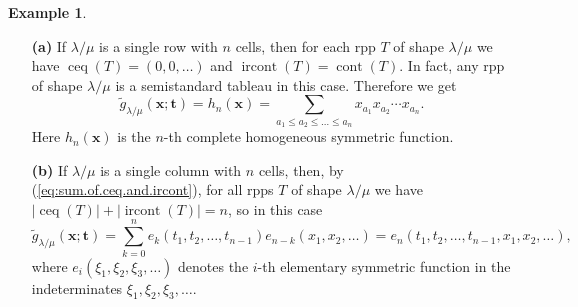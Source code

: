 \documentclass[12pt]{article}
\theoremstyle{plain}
\theoremstyle{definition}
\newtheorem{example}[theorem]{Example}
\let\sumnonlimits\sum
\renewcommand{\sum}{\sumnonlimits\limits}
\def\ceq{{\operatorname{ceq}}}
\def\ircont{{\operatorname{ircont}}}
\def\cont{{\operatorname{cont}}}
\def\g{{\widetilde{g}}}
\def\t{{\mathbf{t}}}
\def\x{{\mathbf{x}}}
\def\lm{{\lambda/\mu}}
\begin{document}
\begin{example}
\label{exa.gtilde.1}

\begin{enumerate}

\item[\textbf{(a)}] If $\lm$ is a single row with $n$ cells, then for each rpp $T$ of shape $\lm$ we have $\ceq(T)=(0,0,\dots)$ and $\ircont(T)=\cont(T)$. In fact, any rpp of shape $\lm$ is a semistandard tableau in this case. Therefore we get 
\[
\g_\lm(\x;\t)=h_n(\x)=\sum_{a_1\leq a_2\leq\dots\leq a_n} x_{a_1}x_{a_2}\cdots x_{a_n}.
\]
 Here $h_n(\x)$ is the $n$-th complete homogeneous symmetric function.


\item[\textbf{(b)}] If $\lm$ is a single column with $n$ cells, then, by (\ref{eq:sum.of.ceq.and.ircont}), for all rpps $T$ of shape $\lm$ we have $|\ceq(T)|+|\ircont(T)|=n$, so in this case
\[
\g_\lm(\x;\t)=\sum_{k=0}^{n}e_{k}\left(  t_{1},t_{2},\ldots,t_{n-1}\right)
e_{n-k}\left(  x_{1},x_{2},\ldots\right) =e_n(t_1,t_2,\dots,t_{n-1},x_1,x_2,\dots),
\]
where $e_{i}\left(  \xi_{1},\xi_{2},\xi_{3},\ldots\right)  $ denotes the
$i$-th elementary symmetric function in the indeterminates $\xi_{1},\xi
_{2},\xi_{3},\ldots$. 



\end{enumerate}
\end{example}
\end{document}

